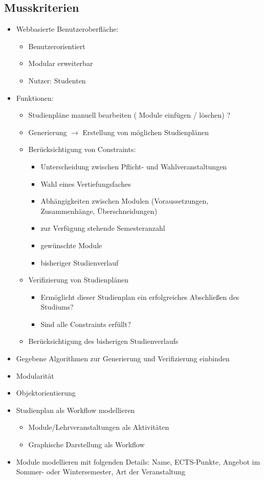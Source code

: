 \documentclass[titlepage=true, parskip=full]{scrartcl}
\begin{document}
\subsection{Musskriterien}
\begin{itemize}[nosep]
	\item Webbasierte Benutzeroberfläche:
	\begin{itemize}[nosep]
		\item Benutzerorientiert 
		\item Modular erweiterbar
		\item Nutzer: Studenten
	\end{itemize}
	\item Funktionen:
	\begin{itemize}[nosep]
		\item Studienpläne manuell bearbeiten ( Module einfügen / löschen) ?
		\item Generierung $\rightarrow$ Erstellung von möglichen Studienplänen
		\item Berücksichtigung von Constraints:
		\begin{itemize}[nosep]
			\item Unterscheidung zwischen Pflicht- und Wahlveranstaltungen
			\item Wahl eines Vertiefungsfaches
			\item Abhängigkeiten zwischen Modulen (Voraussetzungen, Zusammenhänge, Überschneidungen)
			\item zur Verfügung stehende Semesteranzahl
			\item gewünschte Module
			\item bisheriger Studienverlauf
		\end{itemize}
		\item Verifizierung von Studienplänen
		\begin{itemize}[nosep]
			\item Ermöglicht dieser Studienplan ein erfolgreiches Abschließen des Studiums?
			\item Sind alle Constraints erfüllt?
		\end{itemize}
		\item Berücksichtigung des bisherigen Studienverlaufs
	\end{itemize}
	\item Gegebene Algorithmen zur Generierung und Verifizierung einbinden
	\item Modularität
	\item Objektorientierung
	\item Studienplan als Workflow modellieren
	\begin{itemize}[nosep]
		\item Module/Lehrveranstaltungen als Aktivitäten
		\item Graphische Darstellung als Workflow
	\end{itemize}
	\item Module modellieren mit folgenden Details: Name, ECTS-Punkte, Angebot im Sommer- oder Wintersemester, Art der Veranstaltung
\end{itemize}
\end{document}
